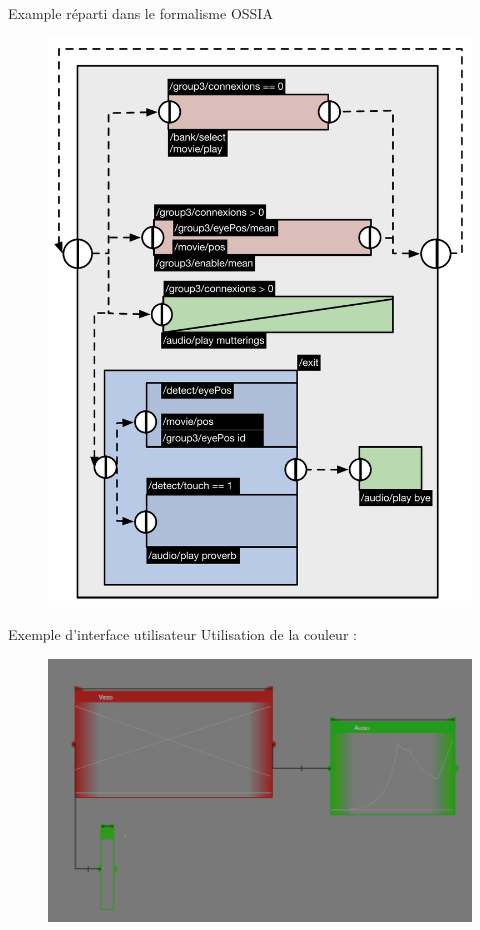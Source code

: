 \begin{frame}{Example réparti dans le formalisme OSSIA}
	\begin{figure}
		\centering
		\includegraphics[scale=0.33]{../src/images/ossiaDistri.pdf}
	\end{figure}
\end{frame}

\begin{frame}{Exemple d'interface utilisateur}
	Utilisation de la couleur : 
	
	\begin{figure}[H]
		\includegraphics[scale=0.3]{images/repartScore.png}
	\end{figure}
\end{frame}
